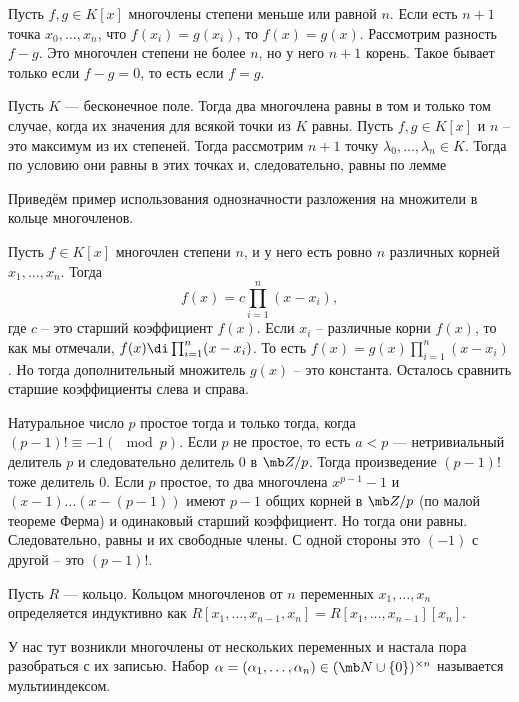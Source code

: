 \lm Пусть $f,g \in K[x]$ многочлены степени меньше или равной $n$. Если есть $n+1$ точка $x_0,\dots,x_n$, что $f(x_i)=g(x_i)$, то $f(x)=g(x)$. 
\elm
\proof Рассмотрим разность $f-g$. Это многочлен степени не более $n$, но у него $n+1$ корень. Такое бывает только если $f-g=0$, то есть если $f=g$.
\endproof

 Пусть $K$ --- бесконечное поле. Тогда два многочлена равны в том и только том случае, когда их значения для всякой точки из $K$ равны.
\ethrm
\proof Пусть $f,g\in K[x]$  и $n$ -- это максимум из их степеней. Тогда рассмотрим $n+1$ точку $\lambda_0,\dots,\lambda_n \in K$. Тогда по условию они равны в этих точках и, следовательно, равны по лемме
\endproof


Приведём пример использования однозначности разложения на множители в кольце многочленов.

\utv Пусть $f\in K[x]$  многочлен степени $n$, и у него есть ровно $n$ различных корней $x_1,\dots,x_n$. Тогда 
$$f(x)=c \prod_{i=1}^n (x-x_i),$$
где $c$ -- это старший коэффициент $f(x)$.
\eutv
\proof Если $x_i$ -- различные корни $f(x)$, то как мы отмечали,  $f(x) \di \prod_{i=1}^n(x-x_i)$. То есть $f(x) = g(x)\prod_{i=1}^n(x-x_i)$. Но тогда дополнительный множитель $g(x)$ -- это константа. Осталось сравнить старшие коэффициенты слева и справа.
\endproof

 Натуральное число $p$ простое тогда и только тогда, когда $(p-1)! \equiv -1(\mod p)$.
\ethrm
\proof Если $p$ не простое, то есть $a<p$ --- нетривиальный делитель $p$ и следовательно делитель $0$ в $\mb Z/p$. Тогда произведение $(p-1)!$ тоже делитель 0.
Если $p$ простое, то два многочлена $x^{p-1}-1$  и $(x-1)\dots(x-(p-1))$ имеют $p-1$ общих корней в $\mb Z/p$ (по малой теореме Ферма) и одинаковый старший коэффициент. Но тогда они равны. Следовательно, равны и их свободные члены. С одной стороны это $(-1)$ с другой -- это $(p-1)!$.
\endproof




 Пусть $R$ — кольцо. Кольцом многочленов от $n$ переменных $x_1, \dots, x_n $ определяется индуктивно как $R[x_1,\dots,x_{n-1},x_n]=R[x_1,\dots,x_{n-1}][x_n]$.
\edfn



У нас тут возникли многочлены от нескольких переменных и настала пора разобраться с их записью.
\dfn Набор $\alpha=(\alpha_1,\dots,\alpha_n) \in (\mb N\cup\{0\})^{\times n}$ называется мультииндексом.
\edfn

